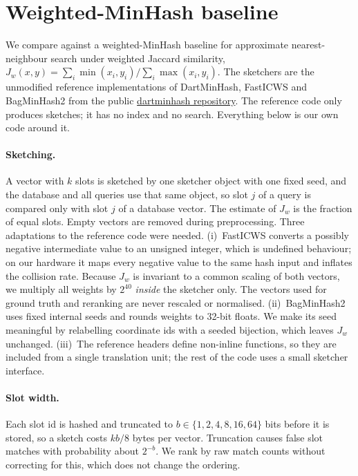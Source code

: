 \documentclass{article}
\begin{document}
\section{Weighted-MinHash baseline}
\label{sec:minhash-baseline}

We compare against a weighted-MinHash baseline for approximate nearest-neighbour
search under weighted Jaccard similarity,
$J_w(x,y)=\sum_i \min(x_i,y_i)\big/\sum_i \max(x_i,y_i)$.
The sketchers are the unmodified reference implementations of
DartMinHash, FastICWS and BagMinHash2 from the public
\href{https://github.com/tobc/dartminhash/tree/master}{dartminhash repository}.
The reference code only produces sketches; it has no index and no search.
Everything below is our own code around it.

\paragraph{Sketching.}
A vector with $k$ slots is sketched by one sketcher object with one fixed seed,
and the database and all queries use that same object, so slot $j$ of a query is
compared only with slot $j$ of a database vector. The estimate of $J_w$ is the
fraction of equal slots. Empty vectors are removed during preprocessing.
Three adaptations to the reference code were needed.
(i)~FastICWS converts a possibly negative intermediate value to an unsigned
integer, which is undefined behaviour; on our hardware it maps every negative
value to the same hash input and inflates the collision rate. Because $J_w$ is
invariant to a common scaling of both vectors, we multiply all weights by $2^{40}$
\emph{inside} the sketcher only. The vectors used for ground truth and reranking
are never rescaled or normalised.
(ii)~BagMinHash2 uses fixed internal seeds and rounds weights to 32-bit floats.
We make its seed meaningful by relabelling coordinate ids with a seeded
bijection, which leaves $J_w$ unchanged.
(iii)~The reference headers define non-inline functions, so they are included
from a single translation unit; the rest of the code uses a small sketcher
interface.

\paragraph{Slot width.}
Each slot id is hashed and truncated to $b\in\{1,2,4,8,16,64\}$ bits before it is stored,
so a sketch costs $kb/8$ bytes per vector. Truncation causes false slot matches
with probability about $2^{-b}$. We rank by raw match counts without
correcting for this, which does not change the ordering.
\end{document}

